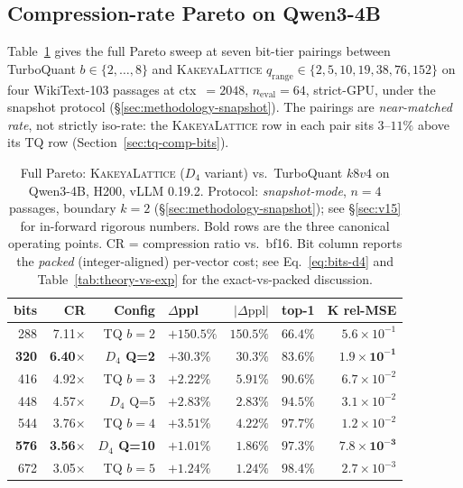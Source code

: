 \documentclass[10pt,a4paper]{article}
\theoremstyle{definition}
\theoremstyle{plain}
\newcommand{\abs}[1]{\left\lvert#1\right\rvert}
\begin{document}
\subsection{Compression-rate Pareto on Qwen3-4B}
\label{sec:bench-pareto}

Table~\ref{tab:pareto-qwen3} gives the full Pareto sweep at seven
bit-tier pairings between TurboQuant $b\in\{2,\ldots,8\}$ and
\textsc{KakeyaLattice} $q_\mathrm{range}\in\{2,5,10,19,38,76,152\}$
on four WikiText-103 passages at ctx~$=\!2048$, $n_\mathrm{eval}=64$,
strict-GPU, under the snapshot protocol
(\S\ref{sec:methodology-snapshot}). The pairings are
\emph{near-matched rate}, not strictly iso-rate: the
\textsc{KakeyaLattice} row in each pair sits $3$--$11\%$ above its
TQ row (Section~\ref{sec:tq-comp-bits}).

\begin{table}[H]
\centering
\small
\caption{Full Pareto: \textsc{KakeyaLattice} ($D_4$ variant) vs.\
TurboQuant $k8v4$ on Qwen3-4B, H200, vLLM 0.19.2. Protocol:
\emph{snapshot-mode}, $n=4$ passages, boundary $k=2$
(\S\ref{sec:methodology-snapshot}); see \S\ref{sec:v15} for
in-forward rigorous numbers. Bold rows are the three canonical
operating points. CR = compression ratio vs.\ bf16. Bit column
reports the \emph{packed} (integer-aligned) per-vector cost; see
Eq.~\eqref{eq:bits-d4} and Table~\ref{tab:theory-vs-exp} for the
exact-vs-packed discussion.}
\label{tab:pareto-qwen3}
\begin{tabular}{rrrlrrr}
  \toprule
  bits & CR & Config & $\Delta$ppl & $\abs{\Delta\text{ppl}}$ & top-1 & K rel-MSE \\
  \midrule
   288 & 7.11$\times$ & TQ $b=2$    & $+150.5\%$ & $150.5\%$ & $66.4\%$ & $5.6\times10^{-1}$ \\
   \textbf{320} & \textbf{6.40}$\times$ & \textbf{$D_4$ Q=2}   & $+30.3\%$  & $30.3\%$  & $\mathbf{83.6\%}$ & $\mathbf{1.9\times10^{-1}}$ \\
   416 & 4.92$\times$ & TQ $b=3$    & $+2.22\%$  & $5.91\%$  & $90.6\%$ & $6.7\times10^{-2}$ \\
   448 & 4.57$\times$ & $D_4$ Q=5    & $+2.83\%$  & $2.83\%$  & $94.5\%$ & $3.1\times10^{-2}$ \\
   544 & 3.76$\times$ & TQ $b=4$    & $+3.51\%$  & $4.22\%$  & $97.7\%$ & $1.2\times10^{-2}$ \\
   \textbf{576} & \textbf{3.56}$\times$ & \textbf{$D_4$ Q=10}  & $+1.01\%$  & $1.86\%$  & $97.3\%$ & $\mathbf{7.8\times10^{-3}}$ \\
   672 & 3.05$\times$ & TQ $b=5$    & $+1.24\%$  & $1.24\%$  & $98.4\%$ & $2.7\times10^{-3}$ \\

\end{tabular}
\end{table}
\end{document}
